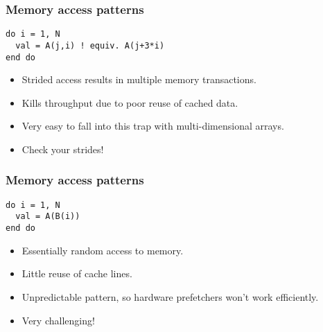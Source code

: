 \documentclass[aspectratio=169]{beamer}
\begin{document}
\begin{frame}[fragile]
\frametitle{Memory access patterns}
\begin{verbatim}
do i = 1, N
  val = A(j,i) ! equiv. A(j+3*i)
end do
\end{verbatim}
\begin{adjustbox}{max width={\textwidth}}
\end{adjustbox}
\begin{itemize}
  \item Strided access results in multiple memory transactions.
  \item Kills throughput due to poor reuse of cached data.
  \item Very easy to fall into this trap with multi-dimensional arrays.
  \item Check your strides!
\end{itemize}
\end{frame}

\begin{frame}[fragile]
\frametitle{Memory access patterns}
\begin{verbatim}
do i = 1, N
  val = A(B(i))
end do
\end{verbatim}
\begin{adjustbox}{max width={\textwidth}}
\end{adjustbox}
\begin{itemize}
  \item Essentially random access to memory.
  \item Little reuse of cache lines.
  \item Unpredictable pattern, so hardware prefetchers won't work efficiently.
  \item Very challenging!
\end{itemize}
\end{frame}
\end{document}
